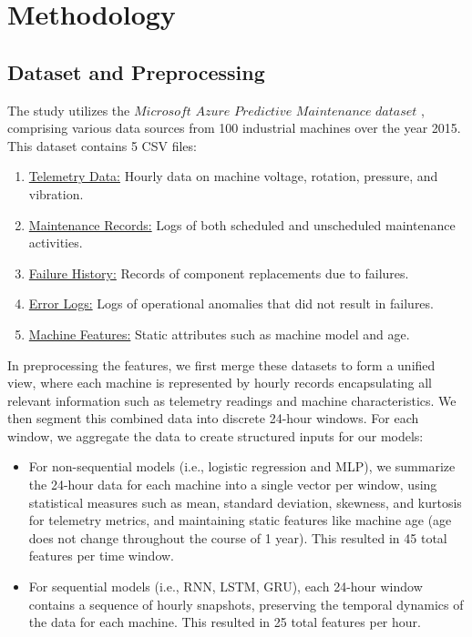 \documentclass{article}
\begin{document}
\section{Methodology}
\label{methdology}

\subsection{Dataset and Preprocessing}

The study utilizes the $\textit{Microsoft Azure Predictive Maintenance dataset}$ \cite{reference1}, comprising various data sources from 100 industrial machines over the year 2015. This dataset contains 5 CSV files:

\begin{enumerate}
    \item \uline{Telemetry Data:} Hourly data on machine voltage, rotation, pressure, and vibration.
    \item \uline{Maintenance Records:} Logs of both scheduled and unscheduled maintenance activities.
    \item \uline{Failure History:} Records of component replacements due to failures.
    \item \uline{Error Logs:} Logs of operational anomalies that did not result in failures.
    \item \uline{Machine Features:} Static attributes such as machine model and age.
\end{enumerate}

In preprocessing the features, we first merge these datasets to form a unified view, where each machine is represented by hourly records encapsulating all relevant information such as telemetry readings and machine characteristics. We then segment this combined data into discrete 24-hour windows. For each window, we aggregate the data to create structured inputs for our models:

\begin{itemize}
    \item For non-sequential models (i.e., logistic regression and MLP), we summarize the 24-hour data for each machine into a single vector per window, using statistical measures such as mean, standard deviation, skewness, and kurtosis for telemetry metrics, and maintaining static features like machine age (age does not change throughout the course of 1 year). This resulted in 45 total features per time window.
    
    \item For sequential models (i.e., RNN, LSTM, GRU), each 24-hour window contains a sequence of hourly snapshots, preserving the temporal dynamics of the data for each machine. This resulted in 25 total features per hour.
    
\end{itemize}
\end{document}
